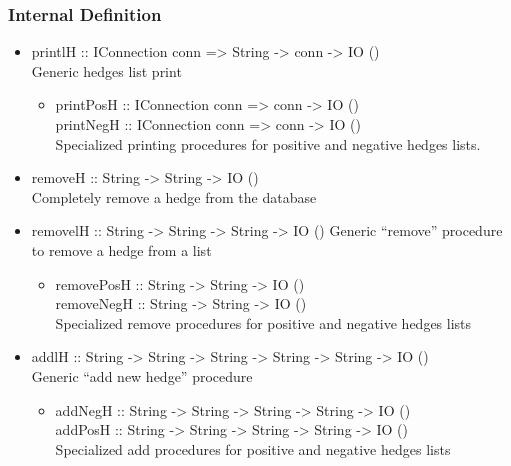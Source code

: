 \documentclass[../gr-final.tex]{subfiles}
\begin{document}
\subsubsection{Internal Definition}
\begin{itemize}
        \item printlH :: IConnection conn => String -> conn -> IO
                ()\\ Generic hedges list print
              \begin{itemize}
               \item printPosH :: IConnection conn => conn -> IO ()\\
                     printNegH :: IConnection conn => conn -> IO ()\\
                     Specialized printing procedures for positive
                     and negative hedges lists.
              \end{itemize}         
             
      \item removeH :: String -> String -> IO ()\\
              Completely remove a hedge from the database
      \item removelH :: String -> String -> String -> IO ()
              Generic ``remove'' procedure to remove a hedge from
              a list
              \begin{itemize}
               \item removePosH :: String -> String -> IO ()
                     \\removeNegH :: String -> String -> IO ()\\
                     Specialized remove procedures for positive
                     and negative hedges lists
              \end{itemize}

      \item addlH :: String -> String -> String -> String -> String -> IO ()
            \\ Generic ``add new hedge'' procedure  
      \begin{itemize}
      \item addNegH :: String -> String -> String -> String -> IO ()
          \\addPosH :: String -> String -> String -> String -> IO ()
          \\ Specialized add procedures for positive
            and negative hedges lists
      \end{itemize}


\end{itemize}
\end{document}
